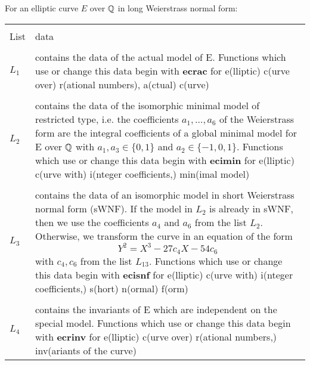 For an elliptic curve $E$ over $\mbox{$\mathbb Q$}$ in long Weierstrass normal form:
\begin{center}
      \begin{tabular}{|p{0.3in}|p{5.2in}|} 
\hline & \\[-1.3ex]
List & data \\[1.5ex]
\hline &\\[-1.3ex]
$L_1$ & contains the data of the actual model of E. Functions which 
         use or change this data begin with {\bf ecrac} for \newline
         e(lliptic) c(urve over) r(ational numbers), a(ctual) c(urve) \\[1.5ex]
\hline & \\[-1.3ex]
$L_2$ & contains the data of the isomorphic minimal model of restricted type, i.e. the
         coefficients $a_1,\ldots, a_6$ of the Weierstrass form are the 
         integral coefficients of a global minimal model for E over
         $\mbox{$\mathbb Q$}$ with $a_1, a_3 \in \{0, 1\}$ and $a_2 \in \{-1, 0, 1\}$. Functions
         which use or change this data begin with {\bf ecimin} for \newline
         e(lliptic) c(urve with) i(nteger coefficients,) min(imal model) \\[1.5ex]
\hline & \\[-1.3ex]
$L_3$ & contains the data of an isomorphic model in short Weierstrass normal form (sWNF).
        If the model in $L_2$ is already in sWNF, then we use the coefficients
        $a_4$ and $a_6$ from the list $L_2$. Otherwise, we transform the curve
        in an equation of the form 
        $$
             Y^2 = X^3 - 27 c_4 X - 54 c_6
        $$ 
        with $c_4, c_6$ from the list $L_{13}$. Functions which use or change this data 
        begin with {\bf ecisnf} for \newline    
        e(lliptic) c(urve with) i(nteger coefficients,) s(hort) n(ormal) f(orm)\\[1.5ex]
\hline & \\[-1.3ex]
$L_4$ & contains the invariants of E which are independent on the special 
        model. Functions which use or change this data begin with {\bf ecrinv} for \newline
        e(lliptic) c(urve over) r(ational numbers,) inv(ariants of the curve)\\[1.5ex]
\hline  
\end{tabular}
\end{center}

